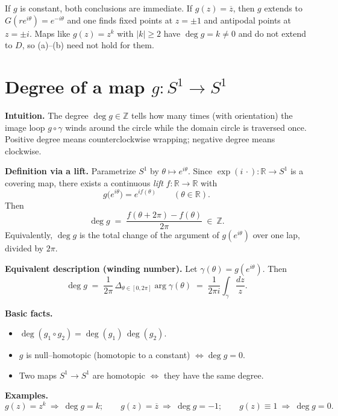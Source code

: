 \documentclass[12pt,a4paper]{article}
\theoremstyle{plain}
\theoremstyle{definition}
\theoremstyle{remark}
\theoremstyle{remark}
\begin{document}
If $g$ is constant, both conclusions are immediate.
If $g(z)=\overline{z}$, then $g$ extends to $G(re^{i\theta})=e^{-i\theta}$ and one finds
fixed points at $z=\pm1$ and antipodal points at $z=\pm i$.
Maps like $g(z)=z^{k}$ with $|k|\ge2$ have $\deg g=k\ne0$ and do not extend to $D$,
so (a)–(b) need not hold for them.


\section*{Degree of a map $g:S^{1}\to S^{1}$}

\noindent\textbf{Intuition.}
The degree $\deg g\in\mathbb{Z}$ tells how many times (with orientation) the image loop
$g\circ \gamma$ winds around the circle while the domain circle is traversed once.
Positive degree means counterclockwise wrapping; negative degree means clockwise.

\bigskip

\noindent\textbf{Definition via a lift.}
Parametrize $S^{1}$ by $\theta\mapsto e^{i\theta}$.
Since $\exp(i\,\cdot):\mathbb{R}\to S^{1}$ is a covering map, there exists a continuous
\emph{lift} $f:\mathbb{R}\to\mathbb{R}$ with
\[
g\bigl(e^{i\theta}\bigr)=e^{i f(\theta)} \qquad (\theta\in\mathbb{R}).
\]
Then
\[
\deg g \;=\; \frac{f(\theta+2\pi)-f(\theta)}{2\pi}\ \in\ \mathbb{Z}.
\]
Equivalently, $\deg g$ is the total change of the argument of $g(e^{i\theta})$ over one lap,
divided by $2\pi$.

\bigskip

\noindent\textbf{Equivalent description (winding number).}
Let $\gamma(\theta)=g(e^{i\theta})$.
Then
\[
\deg g \;=\; \frac{1}{2\pi}\,\Delta_{\theta\in[0,2\pi]}\arg\gamma(\theta)
\;=\; \frac{1}{2\pi i}\int_{\gamma}\frac{dz}{z}.
\]

\bigskip

\noindent\textbf{Basic facts.}
\begin{itemize}\setlength{\itemsep}{0.5em}
	\item $\deg(g_1\!\circ g_2)=\deg(g_1)\,\deg(g_2)$.
	\item $g$ is null–homotopic (homotopic to a constant) $\iff \deg g=0$.
	\item Two maps $S^{1}\to S^{1}$ are homotopic $\iff$ they have the same degree.
\end{itemize}

\bigskip

\noindent\textbf{Examples.}
\[
g(z)=z^{k}\ \Rightarrow\ \deg g=k;\qquad
g(z)=\overline{z}\ \Rightarrow\ \deg g=-1;\qquad
g(z)\equiv 1\ \Rightarrow\ \deg g=0.
\]
\end{document}
